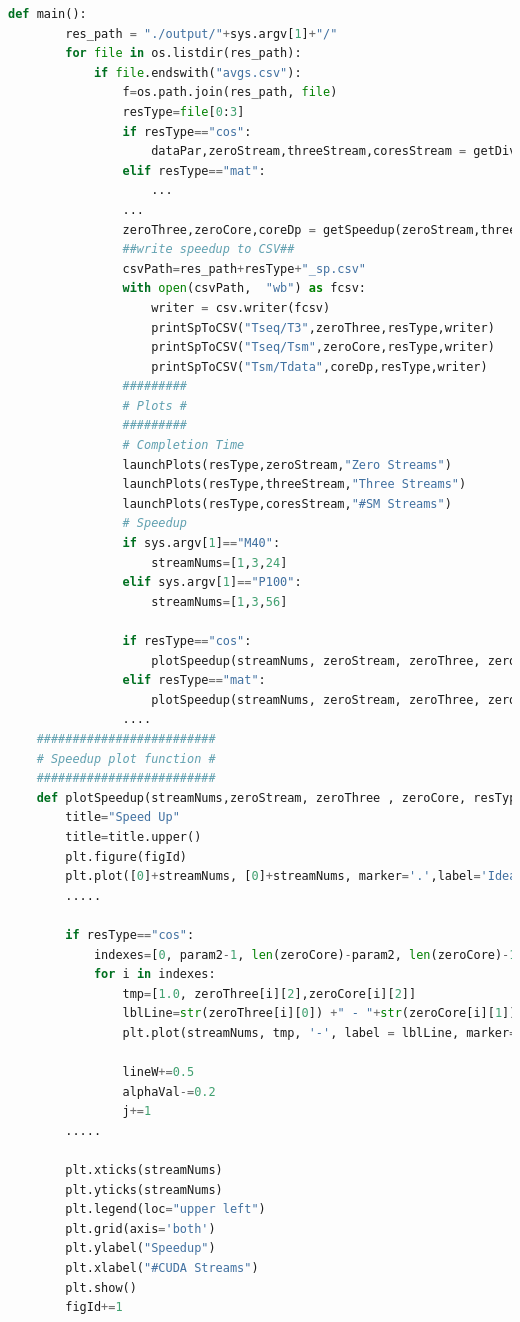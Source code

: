 	\begin{lstlisting}[caption={Portion of speedup and plots Python script}, language=python]
	def main():		
		res_path = "./output/"+sys.argv[1]+"/"
		for file in os.listdir(res_path):
			if file.endswith("avgs.csv"):
				f=os.path.join(res_path, file)				
				resType=file[0:3]
				if resType=="cos":
					dataPar,zeroStream,threeStream,coresStream = getDividedData(dpCosTest,strCosTest,f)	
				elif resType=="mat":
					...
				...				
				zeroThree,zeroCore,coreDp = getSpeedup(zeroStream,threeStream,coresStream,dataPar)				
				##write speedup to CSV##
				csvPath=res_path+resType+"_sp.csv"		
				with open(csvPath,  "wb") as fcsv:
					writer = csv.writer(fcsv) 					
					printSpToCSV("Tseq/T3",zeroThree,resType,writer) 
					printSpToCSV("Tseq/Tsm",zeroCore,resType,writer)
					printSpToCSV("Tsm/Tdata",coreDp,resType,writer)	
				#########
				# Plots #
				#########
				# Completion Time
				launchPlots(resType,zeroStream,"Zero Streams")
				launchPlots(resType,threeStream,"Three Streams")
				launchPlots(resType,coresStream,"#SM Streams")
				# Speedup	
				if sys.argv[1]=="M40":
					streamNums=[1,3,24]
				elif sys.argv[1]=="P100":
					streamNums=[1,3,56]				
				
				if resType=="cos":
					plotSpeedup(streamNums, zeroStream, zeroThree, zeroCore, resType, cosN, cosM)	
				elif resType=="mat":
					plotSpeedup(streamNums, zeroStream, zeroThree, zeroCore, resType, matNum, matSize)		
				....			
	#########################
	# Speedup plot function #
	#########################
	def plotSpeedup(streamNums,zeroStream, zeroThree , zeroCore, resType,param1,param2):				
		title="Speed Up"		
		title=title.upper()				
		plt.figure(figId)
		plt.plot([0]+streamNums, [0]+streamNums, marker='.',label='Ideal speed up',linestyle='--')
		.....
	
		if resType=="cos":
			indexes=[0, param2-1, len(zeroCore)-param2, len(zeroCore)-1]
			for i in indexes:
				tmp=[1.0, zeroThree[i][2],zeroCore[i][2]]
				lblLine=str(zeroThree[i][0]) +" - "+str(zeroCore[i][1])
				plt.plot(streamNums, tmp, '-', label = lblLine, marker=markers[j], linestyle='-', linewidth=lineW, alpha=alphaVal)
				
				lineW+=0.5
				alphaVal-=0.2
				j+=1
		.....
		
		plt.xticks(streamNums)
		plt.yticks(streamNums)
		plt.legend(loc="upper left")
		plt.grid(axis='both')
		plt.ylabel("Speedup")
		plt.xlabel("#CUDA Streams")
		plt.show()
		figId+=1
	\end{lstlisting}
	
